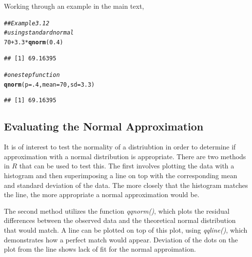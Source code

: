 \documentclass{report}\usepackage[]{graphicx}\usepackage[]{color}
\makeatletter
\newcommand{\hlnum}[1]{\textcolor[rgb]{0.686,0.059,0.569}{#1}}%
\newcommand{\hlcom}[1]{\textcolor[rgb]{0.678,0.584,0.686}{\textit{#1}}}%
\newcommand{\hlopt}[1]{\textcolor[rgb]{0,0,0}{#1}}%
\newcommand{\hlstd}[1]{\textcolor[rgb]{0.345,0.345,0.345}{#1}}%
\newcommand{\hlkwc}[1]{\textcolor[rgb]{0.333,0.667,0.333}{#1}}%
\newcommand{\hlkwd}[1]{\textcolor[rgb]{0.737,0.353,0.396}{\textbf{#1}}}%
\newenvironment{kframe}{%
 \def\at@end@of@kframe{}%
 \ifinner\ifhmode%
  \def\at@end@of@kframe{\end{minipage}}%
  \begin{minipage}{\columnwidth}%
 \fi\fi%
 \def\FrameCommand##1{\hskip\@totalleftmargin \hskip-\fboxsep
 \colorbox{shadecolor}{##1}\hskip-\fboxsep
     \hskip-\linewidth \hskip-\@totalleftmargin \hskip\columnwidth}%
 \MakeFramed {\advance\hsize-\width
   \@totalleftmargin\z@ \linewidth\hsize
   \@setminipage}}%
 {\par\unskip\endMakeFramed%
 \at@end@of@kframe}
\newenvironment{knitrout}{}{} %
\makeatother
\begin{document}
\vspace{.5cm}
Working through an example in the main text, 
\begin{knitrout}
\color{fgcolor}\begin{kframe}
\begin{alltt}
\hlcom{## Example 3.12 }
\hlcom{# using standard normal }
\hlnum{70} \hlopt{+} \hlnum{3.3}\hlopt{*}\hlkwd{qnorm}\hlstd{(}\hlnum{0.4}\hlstd{)}
\end{alltt}
\begin{verbatim}
## [1] 69.16395
\end{verbatim}
\begin{alltt}
\hlcom{# one step function }
\hlkwd{qnorm}\hlstd{(}\hlkwc{p} \hlstd{=} \hlnum{.4}\hlstd{,} \hlkwc{mean} \hlstd{=} \hlnum{70}\hlstd{,} \hlkwc{sd} \hlstd{=} \hlnum{3.3}\hlstd{)}
\end{alltt}
\begin{verbatim}
## [1] 69.16395
\end{verbatim}
\end{kframe}
\end{knitrout}

\subsection{Evaluating the Normal Approximation} 
It is of interest to test the normality of a distriubtion in order to determine if approximation with a normal distribution is appropriate. There are two methods in $R$ that can be used to test this.  The first involves plotting the data with a histogram and then superimposing a line on top with the corresponding mean and standard deviation of the data.  The more closely that the histogram matches the line, the more appropriate a normal approximation would be.  

The second method utilizes the function \textit{qqnorm()}, which plots the residual differences between the observed data and the theoretical normal distribution that would match.  A line can be plotted on top of this plot, using \textit{qqline()}, which demonstrates how a perfect match would appear.  Deviation of the dots on the plot from the line shows lack of fit for the normal approimation.  
\end{document}
